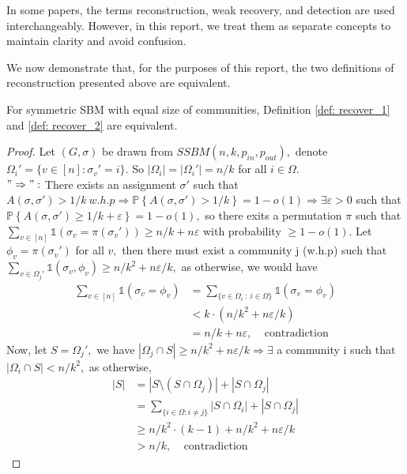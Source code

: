 \begin{remark}
    In some papers, the terms reconstruction, weak recovery, and detection are used interchangeably. However, in this report, we treat them as separate concepts to maintain clarity and avoid confusion.
\end{remark}
We now demonstrate that, for the purposes of this report, the two definitions of reconstruction presented above are equivalent.
\begin{claim}\label{claim1}
    For symmetric SBM with equal size of communities, Definition \ref{def: recover_1} and \ref{def: recover_2} are equivalent.
\end{claim}
\begin{proof}
    Let $(G, \sigma)$ be drawn from $SSBM(n, k, p_{in}, p_{out}),$ denote $\Omega_i' = \{ v\in [n] : \sigma_v' = i \}.$ So $|\Omega_i|=|\Omega_i'|=n/k$ for all $i\in\Omega.$ \vspace{1mm}\\
    $"\Rightarrow":$ There exists an assignment $\sigma'$ such that $A(\sigma, \sigma')>1/k~w.h.p \Rightarrow \mathbb{P}\left\{A(\sigma, \sigma')>1/k\right\}=1-o(1)\Rightarrow\exists\varepsilon>0$ such that $\mathbb{P}\left\{A(\sigma, \sigma')\geq1/k+\varepsilon\right\}=1-o(1),$ so there exits a permutation $\pi$ such that $\sum_{v\in[n]}\mathbb{1}(\sigma_v=\pi(\sigma_v'))\geq n/k + n\varepsilon$ with probability $\geq 1-o(1)$. Let $\phi_v=\pi(\sigma_v')$ for all $v,$  then there must exist a community j (w.h.p) such that $\sum_{v\in \Omega_j'}\mathbb{1}(\sigma_v, \phi_v)\geq n/k^2 +n\varepsilon/k,$ as otherwise, we would have 
    \begin{align*}
        \sum_{v\in[n]}\mathbb{1}(\sigma_v=\phi_v)&=\sum_{\{v\in\Omega_i^{}~:~i\in\Omega\}}\mathbb{1}(\sigma_v=\phi_v)\\
        &< k\cdot(n/k^2 +n\varepsilon/k)\\
        &= n/k + n\varepsilon,~~~~~\text{contradiction}
    \end{align*} Now, let $S=\Omega_j',$ we have $|\Omega_j\cap S|\geq n/k^2 +n\varepsilon/k \Rightarrow \exists$ a community i such that $|\Omega_i\cap S|<n/k^2,$ as otherwise, 
    \begin{align*}
         |S|&=|S\setminus(S\cap\Omega_j)|+|S\cap\Omega_j|\\
         &=\sum_{\{i\in\Omega:i\neq j\}}|S\cap\Omega_i|+|S\cap\Omega_j|\\
         &\geq n/k^2\cdot(k-1)+n/k^2 +n\varepsilon/k\\
         &>n/k,~~~~~\text{contradiction}

\end{align*}
\end{proof}
